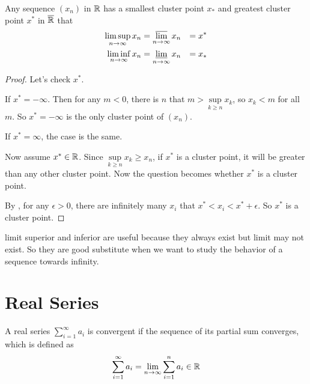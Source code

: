 \begin{theorem}
    Any sequence $(x_n)$ in $\mathbb{R}$ has a smallest cluster point $x_*$ and greatest cluster point $x^*$ in $\overline{\mathbb{R}}$ that
    \begin{equation}
        \begin{aligned}
            \limsup_{n \rightarrow \infty} x_n &= \varlimsup_{n\rightarrow \infty} x_n &= x^* \\
            \liminf_{n \rightarrow \infty} x_n &= \varliminf_{n\rightarrow \infty} x_n &= x_*
        \end{aligned}
    \end{equation}
\end{theorem}
\begin{proof}
    Let's check $x^*$. 
    
    If $x^* = - \infty$. Then for any $m < 0$, there is $n$ that $m > \underset{k \geq n}{\text{ sup }} x_k$, so $x_k < m$ for all $m$. So $x^* = -\infty$ is the only cluster point of $(x_n)$.
    
    If $x^* = \infty$, the case is the same.
        
    Now assume $x^* \in \mathbb{R}$. Since $\underset{k \geq n}{\text{ sup }} x_k \geq x_n$, if $x^*$ is a cluster point, it will be greater than any other cluster point. Now the question becomes whether $x^*$ is a cluster point. 
    
    By , for any $\epsilon>0$, there are infinitely many $x_i$ that $x^* < x_i < x^* + \epsilon$. So $x^*$ is a cluster point.
\end{proof}

limit superior and inferior are useful because they always exist but limit may not exist. So they are good substitute when we want to study the behavior of a sequence towards infinity.




\section{Real Series}

\begin{definition}
    A real series $\sum_{i=1}^\infty a_i$ is convergent if the sequence of its partial sum converges, which is defined as
    \begin{equation}
        \sum_{i=1}^\infty a_i = \lim_{n \rightarrow \infty} \sum_{i=1}^n a_i \in \mathbb{R}
    \end{equation}
\end{definition}


